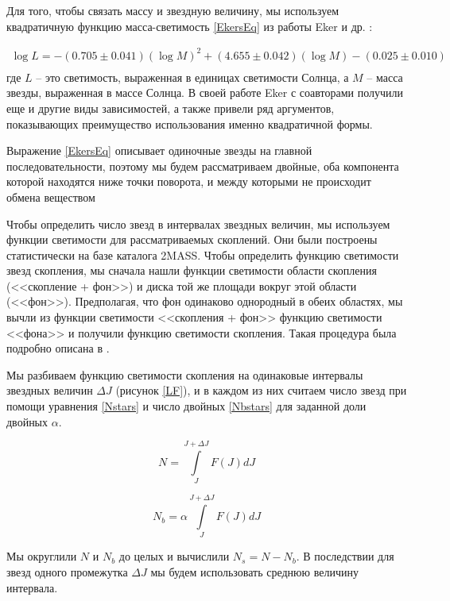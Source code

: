 \documentclass[a4paper,12pt]{article}
\begin{document}
Для того, чтобы связать массу и звездную величину, мы используем квадратичную функцию масса-светимость \ref{EkersEq} из работы Eker и др. \cite{Eker}:

\begin{equation}
\begin{array}{l}
\log{L} = - (0.705 \pm 0.041)(\log{M})^2  + (4.655 \pm 0.042) (\log {M}) - (0.025 \pm 0.010)\\
\label{EkersEq}
\end{array}
\end{equation}
где $L$ -- это светимость, выраженная в единицах светимости Солнца, а $M$  -- масса звезды, выраженная в массе Солнца.
 В своей работе Eker \cite{Eker} с соавторами получили еще и другие виды зависимостей, а также привели ряд аргументов, показывающих преимущество использования именно квадратичной формы.
 
 Выражение \ref{EkersEq} описывает одиночные звезды на главной последовательности, поэтому мы будем рассматриваем двойные, оба компонента которой находятся ниже точки поворота, и между которыми не происходит обмена веществом
 
Чтобы определить число звезд в интервалах звездных величин, мы используем функции светимости для рассматриваемых скоплений. Они были построены статистически на базе каталога 2MASS. Чтобы определить функцию светимости звезд скопления, мы сначала нашли функции светимости области скопления (<<скопление + фон>>) и диска той же площади вокруг этой области (<<фон>>). Предполагая, что фон одинаково однородный в обеих областях, мы вычли из функции светимости <<скопления + фон>> функцию светимости <<фона>> и получили функцию светимости скопления. Такая процедура была подробно описана в \cite{4337}.

Мы разбиваем функцию светимости скопления на одинаковые интервалы звездных величин $\Delta J$ (рисунок \ref{LF}), и в каждом из них считаем число звезд при помощи уравнения \eqref{Nstars} и число двойных \eqref{Nbstars} для заданной доли двойных $\alpha$.

\begin{equation}
N = \int\limits_J^{J+\Delta J}{F(J)dJ}
\label{Nstars}
\end{equation}

\begin{equation}
N_{b}=\alpha \int\limits_J^{J+\Delta J}{F(J)dJ}
\label{Nbstars}
\end{equation}

Мы округлили $N$ и $N_{b}$ до целых и вычислили $N_{s} = N - N_{b}$. В последствии для звезд одного промежутка $\Delta J$ мы будем использовать среднюю величину интервала.
\end{document}
